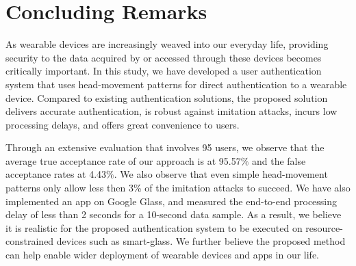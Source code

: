\section{Concluding Remarks}
\label{sec:conc}
As wearable devices are increasingly weaved into our everyday life, providing security to the data acquired by or accessed through these devices becomes critically important. In this study, we have developed a user authentication system that uses head-movement patterns for direct
authentication to a wearable device. Compared to existing authentication solutions, the proposed solution delivers accurate authentication, is robust against imitation attacks, incurs low processing delays, and offers great convenience to users. 

Through an extensive evaluation that involves 95 users, we observe that the
average true acceptance rate of our approach is at 95.57$\%$ and the false
acceptance rates at 4.43$\%$. We also observe that even simple head-movement patterns only allow less then 3\% of the imitation attacks to succeed. We have also implemented an app on Google Glass, and measured the end-to-end processing delay of less than 2 seconds for a 10-second data sample. As a result, we believe it is realistic for the proposed authentication system to be executed on resource-constrained devices such as smart-glass. We further believe the proposed method can help enable wider deployment of wearable devices and apps in our life.


